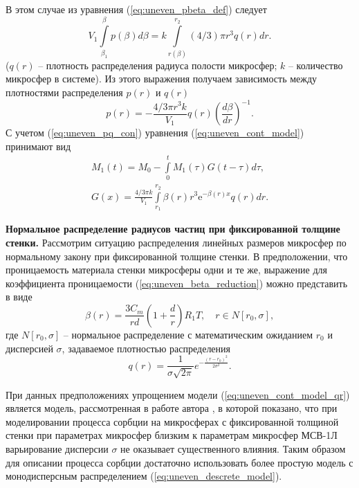 В этом случае из уравнения (\ref{eq:uneven_pbeta_def})  следует
\begin{equation*}
V_1 \int\limits_{\beta_1}^{\beta}p(\beta)d\beta = k \int\limits_{r(\beta)}^{r_2}(4/3)\pi r^3 q(r) dr.
\end{equation*}
($q(r)$ -- плотность распределения радиуса полости микросфер; $k$ -- количество микросфер в системе). Из этого выражения получаем зависимость между плотностями распределения $p(r)$ и $q(r)$
\begin{equation}
\label{eq:uneven_pq_con}
p(r) = - \frac{4/3 \pi r^3 k}{V_1}  q(r) \left( \frac{d\beta}{dr} \right)^{-1}.
\end{equation}
С учетом (\ref{eq:uneven_pq_con}) уравнения (\ref{eq:uneven_cont_model}) принимают вид
\begin{equation}
\label{eq:uneven_cont_model_qr}
\begin{array}{c}
M_1(t)=M_0-\int\limits_{0}^{t}  M_1(\tau)  G(t-\tau) d\tau, \\
G(x) = \displaystyle\frac{4/3 \pi k}{V_1} \int\limits_{r_1}^{r_2}\beta(r) r^3  \mathrm{e}^{-\beta(r) x} q(r) dr.
\end{array}
\end{equation}

\textbf{Нормальное распределение радиусов частиц при фиксированной толщине стенки.}
Рассмотрим ситуацию распределения линейных размеров микросфер по нормальному закону при фиксированной толщине стенки.  В предположении, что проницаемость материала стенки микросферы одни и те же, выражение для коэффициента проницаемости (\ref{eq:uneven_beta_reduction})  можно представить в виде
\[
\beta(r) = \frac{3 C_m}{r d}\left(1+\displaystyle\frac{d}{r}\right) R_1 T, \quad r \in N[r_0, \sigma],
\]
где $N[r_0, \sigma]$ -- нормальное распределение с математическим ожиданием $r_0$ и дисперсией $\sigma$, задаваемое плотностью распределения 
\[
q(r) = \frac{1}{\sigma\sqrt{2\pi}}e^{-\displaystyle\frac{(r-r_0)^2}{2\sigma^2}}.
\]

При данных предположениях упрощением модели (\ref{eq:uneven_cont_model_qr})  является модель, рассмотренная в работе автора \cite{Ver_Norm_Dist}, в которой показано, что при моделировании процесса сорбции на микросферах с фиксированной толщиной стенки при параметрах микросфер близким к параметрам микросфер МСВ-1Л варьирование дисперсии $\sigma$ не оказывает существенного влияния. Таким образом для описании процесса сорбции достаточно использовать более простую модель с монодисперсным распределением (\ref{eq:uneven_descrete_model}).


